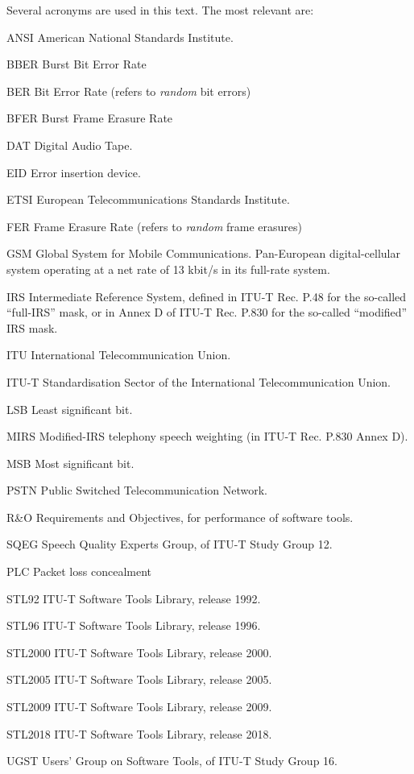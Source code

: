 Several acronyms are used in this text. The most relevant are:
\begin{Descr}{20mm}
\item[ANSI]  American National Standards Institute.
\item[BBER]  Burst Bit Error Rate
\item[BER]   Bit Error Rate (refers to {\em random} bit errors)
\item[BFER]  Burst Frame Erasure Rate
\item[DAT]   Digital Audio Tape.
\item[EID]   Error insertion device.
\item[ETSI]  European Telecommunications Standards Institute.
\item[FER]   Frame Erasure Rate (refers to {\em random} frame erasures)
\item[GSM]   Global System for Mobile Communications. Pan-European
             digital-cellular system operating at a net rate of 13
             kbit/s in its full-rate system.
\item[IRS]   Intermediate Reference System, defined in ITU-T Rec. P.48
             for the so-called ``full-IRS'' mask, or in Annex D of ITU-T
             Rec. P.830 for the so-called ``modified'' IRS mask.
\item[ITU]   International Telecommunication Union.
\item[ITU-T] Standardisation Sector of the International
             Telecommunication Union.
\item[LSB]   Least significant bit.
\item[MIRS]  Modified-IRS telephony speech weighting (in ITU-T Rec. P.830 Annex D).
\item[MSB]   Most significant bit.
\item[PSTN]  Public Switched Telecommunication Network.
\item[R\&O]  Requirements and Objectives, for performance of software tools.
\item[SQEG]  Speech Quality Experts Group, of ITU-T Study Group 12.
\item[PLC]   Packet loss concealment
\item[STL92] ITU-T Software Tools Library, release 1992.
\item[STL96] ITU-T Software Tools Library, release 1996.
\item[STL2000] ITU-T Software Tools Library, release 2000.
\item[STL2005] ITU-T Software Tools Library, release 2005.
\item[STL2009] ITU-T Software Tools Library, release 2009.
\item[STL2018] ITU-T Software Tools Library, release 2018.
\item[UGST]  Users' Group on Software Tools, of ITU-T Study Group 16.
\end{Descr}


